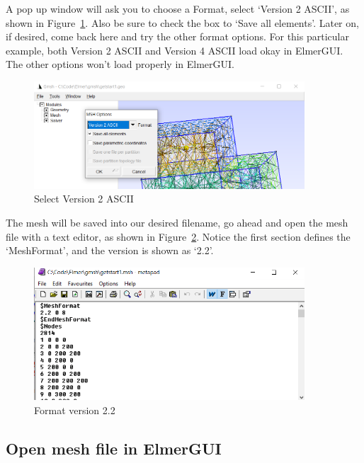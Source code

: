 \newpage

A pop up window will ask you to choose a Format, select `Version 2 ASCII', as shown in Figure~\ref{fg:gmsh-31}.  Also be sure to check the box to `Save all elements'.  Later on, if desired, come back here and try the other format options.  For this particular example, both Version 2 ASCII and Version 4 ASCII load okay in ElmerGUI.  The other options won't load properly in ElmerGUI.  

\begin{figure}[H]
\centering
\includegraphics[width=0.9\textwidth]{gmsh-31}
\caption{Select Version 2 ASCII}\label{fg:gmsh-31}
\end{figure}

The mesh will be saved into our desired filename, go ahead and open the mesh file with a text editor, as shown in Figure~\ref{fg:gmsh-32}.  Notice the first section defines the `MeshFormat', and the version is shown as `2.2'.

\begin{figure}[H]
\centering
\includegraphics[width=0.9\textwidth]{gmsh-32}
\caption{Format version 2.2}\label{fg:gmsh-32}
\end{figure}

\newpage

\subsection{Open mesh file in ElmerGUI}

